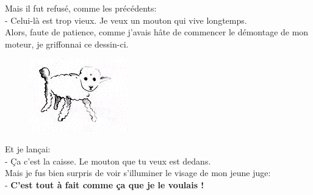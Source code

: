 \begin{multicols}{2}
  Mais il fut refusé, comme les précédents: \\
  - Celui-là est trop vieux. Je veux un mouton qui vive longtemps. \\
  Alors, faute de patience, comme j'avais hâte de commencer le démontage de mon moteur, je griffonnai ce dessin-ci.
  
  \begin{figure}[H]
    \centering
    \includegraphics[width=0.3\linewidth]{4x5-calcul-litteral/mouton2.png}
  \end{figure}

  Et je lançai: \\
  - Ça c'est la caisse. Le mouton que tu veux est dedans. \\
  Mais je fus bien surpris de voir s'illuminer le visage de mon jeune juge: \\
  - \textbf{C'est tout à fait comme ça que je le voulais ! }
\end{multicols}

